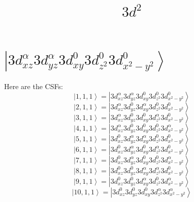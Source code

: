 \documentclass[11pt]{article}
\title{$3d^{2}$}
\begin{document}
\maketitle
\section{$\left|3d_{xz}^{\alpha}3d_{yz}^{\alpha}3d_{xy}^{0}3d_{z^2}^{0}3d_{x^2-y^2}^{0}\right\rangle$}

Here are the CSFs:\newline\newline
\begin{equation*}
\left|1,1,1\right>=\left|3d_{xz}^{\alpha}3d_{yz}^{\alpha}3d_{xy}^{0}3d_{z^2}^{0}3d_{x^2-y^2}^{0}\right>\end{equation*}
\begin{equation*}
\left|2,1,1\right>=\left|3d_{xz}^{\alpha}3d_{yz}^{0}3d_{xy}^{\alpha}3d_{z^2}^{0}3d_{x^2-y^2}^{0}\right>\end{equation*}
\begin{equation*}
\left|3,1,1\right>=\left|3d_{xz}^{\alpha}3d_{yz}^{0}3d_{xy}^{0}3d_{z^2}^{\alpha}3d_{x^2-y^2}^{0}\right>\end{equation*}
\begin{equation*}
\left|4,1,1\right>=\left|3d_{xz}^{\alpha}3d_{yz}^{0}3d_{xy}^{0}3d_{z^2}^{0}3d_{x^2-y^2}^{\alpha}\right>\end{equation*}
\begin{equation*}
\left|5,1,1\right>=\left|3d_{xz}^{0}3d_{yz}^{\alpha}3d_{xy}^{\alpha}3d_{z^2}^{0}3d_{x^2-y^2}^{0}\right>\end{equation*}
\begin{equation*}
\left|6,1,1\right>=\left|3d_{xz}^{0}3d_{yz}^{\alpha}3d_{xy}^{0}3d_{z^2}^{\alpha}3d_{x^2-y^2}^{0}\right>\end{equation*}
\begin{equation*}
\left|7,1,1\right>=\left|3d_{xz}^{0}3d_{yz}^{\alpha}3d_{xy}^{0}3d_{z^2}^{0}3d_{x^2-y^2}^{\alpha}\right>\end{equation*}
\begin{equation*}
\left|8,1,1\right>=\left|3d_{xz}^{0}3d_{yz}^{0}3d_{xy}^{\alpha}3d_{z^2}^{\alpha}3d_{x^2-y^2}^{0}\right>\end{equation*}
\begin{equation*}
\left|9,1,1\right>=\left|3d_{xz}^{0}3d_{yz}^{0}3d_{xy}^{\alpha}3d_{z^2}^{0}3d_{x^2-y^2}^{\alpha}\right>\end{equation*}
\begin{equation*}
\left|10,1,1\right>=\left|3d_{xz}^{0}3d_{yz}^{0}3d_{xy}^{0}3d_{z^2}^{\alpha}3d_{x^2-y^2}^{\alpha}\right>\end{equation*}
\end{document}
